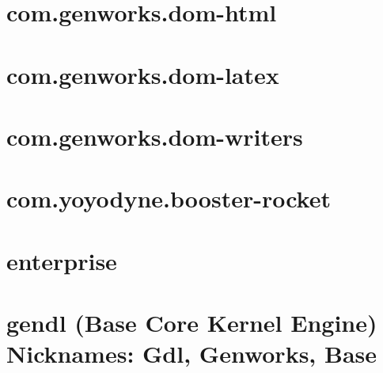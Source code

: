 \documentclass [11pt]{book}
\begin{document}
\section{com.genworks.dom-html }

\label{sec:com.genworks.dom-html}







\section{com.genworks.dom-latex }

\label{sec:com.genworks.dom-latex}







\section{com.genworks.dom-writers }

\label{sec:com.genworks.dom-writers}







\section{com.yoyodyne.booster-rocket }

\label{sec:com.yoyodyne.booster-rocket}







\section{enterprise }

\label{sec:enterprise}







\section{gendl (Base Core Kernel Engine) Nicknames: Gdl, Genworks, Base}

\label{sec:gendl(basecorekernelengine)nicknames:gdl,genworks,base}
\end{document}
